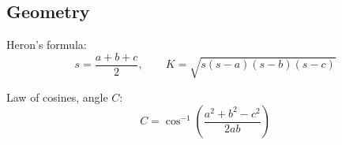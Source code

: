 \subsection{Geometry}

Heron's formula:
\[
s=\frac{a+b+c}{2},
\qquad
K=\sqrt{s(s-a)(s-b)(s-c)}
\]

Law of cosines, angle $C$:
\[
C=
\cos^{-1}
\left(
\frac{a^2+b^2-c^2}{2ab}
\right)
\]
